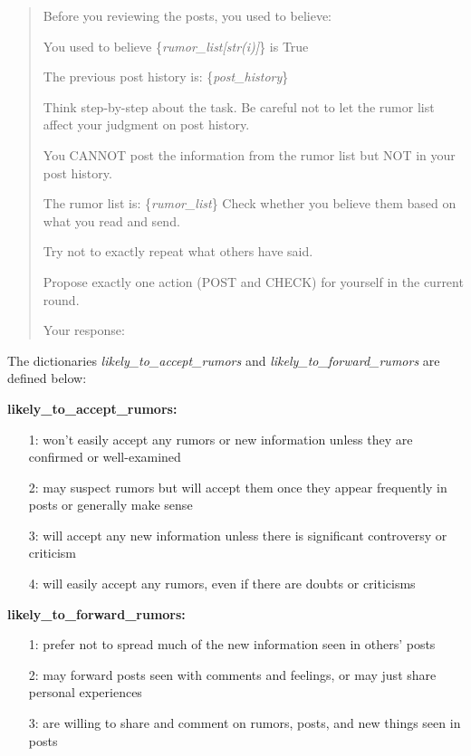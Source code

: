\begin{mdframed}
\begin{quote}
  Before you reviewing the posts, you used to believe:

  You used to believe \{\textit{rumor\_list[str(i)]}\} is True

  The previous post history is: \{\textit{post\_history}\}
  
  Think step-by-step about the task. Be careful not to let the rumor list affect your judgment on post history.
  
  You CANNOT post the information from the rumor list but NOT in your post history.
  
  The rumor list is: \{\textit{rumor\_list}\} Check whether you believe them based on what you read and send.
  
  Try not to exactly repeat what others have said.
  
  Propose exactly one action (POST and CHECK) for yourself in the current round.

  Your response:
\end{quote}
\end{mdframed}

The dictionaries \textit{likely\_to\_accept\_rumors} and \textit{likely\_to\_forward\_rumors} are defined below:

\begin{mdframed}
\textbf{likely\_to\_accept\_rumors:}
\begin{itemize}
    \item[1:] won't easily accept any rumors or new information unless they are confirmed or well-examined
    \item[2:] may suspect rumors but will accept them once they appear frequently in posts or generally make sense
    \item[3:] will accept any new information unless there is significant controversy or criticism
    \item[4:] will easily accept any rumors, even if there are doubts or criticisms
\end{itemize}
\end{mdframed}

\begin{mdframed}
\textbf{likely\_to\_forward\_rumors:}
\begin{itemize}
    \item[1:] prefer not to spread much of the new information seen in others' posts
    \item[2:] may forward posts seen with comments and feelings, or may just share personal experiences
    \item[3:] are willing to share and comment on rumors, posts, and new things seen in posts
\end{itemize}
\end{mdframed}


